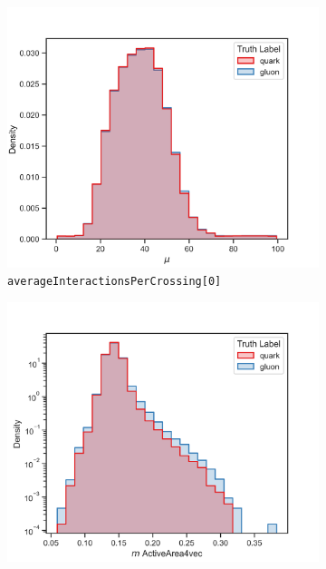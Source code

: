 \begin{figure}[!htb]
	\centering
	\begin{subfigure}[t]{0.48\textwidth}
		\includegraphics[width=1\textwidth]{src/plots/distributions/highlevel/corrected_averageInteractionsPerCrossing[0].png}
		\caption{\texttt{averageInteractionsPerCrossing[0]}}
		\label{fig:highlevel_0}
	\end{subfigure}
	\begin{subfigure}[t]{0.48\textwidth}
		\includegraphics[width=1\textwidth]{src/plots/distributions/highlevel/jets_ActiveArea4vec_m.png}

\end{subfigure}
\end{figure}

